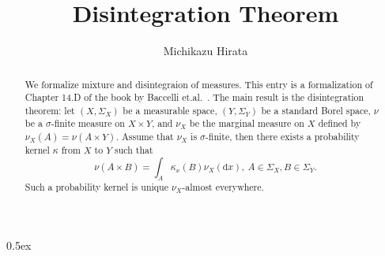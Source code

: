 \documentclass[11pt,a4paper]{article}
\begin{document}
\title{Disintegration Theorem}
\author{Michikazu Hirata}
\maketitle
\begin{abstract}
  We formalize mixture and disintegraion of measures.
  This entry is a formalization of Chapter 14.D of the book by Baccelli et.al.~\cite{baccelli:hal-02460214}.
  The main result is the disintegration theorem:
  let $(X,\Sigma_X)$ be a measurable space, $(Y,\Sigma_Y)$ be a standard Borel space, $\nu$ be a $\sigma$-finite measure on $X \times Y$,
  and $\nu_X$ be the marginal measure on $X$ defined by $\nu_X(A) = \nu(A\times Y)$.
  Assume that $\nu_X$ is $\sigma$-finite, then there exists a probability kernel $\kappa$
  from $X$ to $Y$ such that
  \[ \nu(A\times B) = \int_A \kappa_x (B) \nu_X(\mathrm{d}x), \: A\in\Sigma_X, B\in\Sigma_Y.\]
  Such a probability kernel is unique $\nu_X$-almost everywhere.
\end{abstract}

\tableofcontents

\parindent 0pt\parskip 0.5ex





\end{document}
